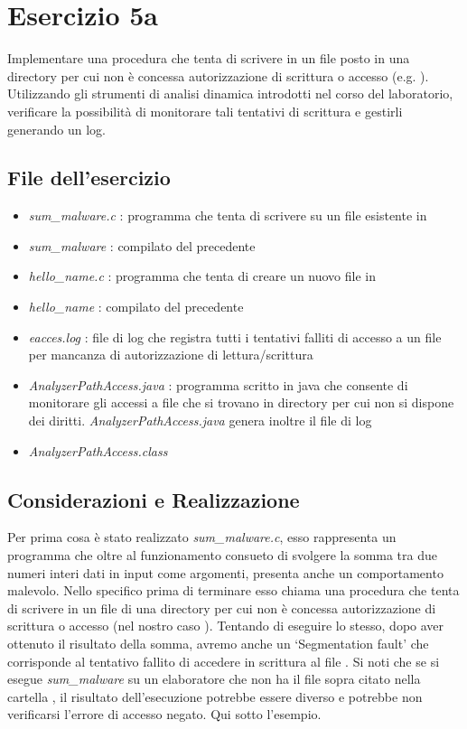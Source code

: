 \documentclass{article}
\newcommand{\filename}[1]{\textit{#1}}
\begin{document}
\section{Esercizio 5a}

\begin{consegna}
Implementare una procedura che tenta di scrivere in un file posto in una directory per cui non è concessa autorizzazione di scrittura o accesso (e.g. ).
Utilizzando gli strumenti di analisi dinamica introdotti nel corso del laboratorio, verificare la possibilità di monitorare tali tentativi di scrittura e gestirli generando un log.
\end{consegna}

\subsection{File dell'esercizio}
\begin{itemize}
    \item \filename{sum\_malware.c} : programma che tenta di scrivere su un file esistente in 
    \item \filename{sum\_malware} : compilato del precedente
    \item \filename{hello\_name.c} : programma che tenta di creare un nuovo file in 
    \item \filename{hello\_name} : compilato del precedente
    \item \filename{eacces.log} : file di log che registra tutti i tentativi falliti di accesso a un file per mancanza di autorizzazione di lettura/scrittura
    \item \filename{AnalyzerPathAccess.java} : programma scritto in java che consente di monitorare gli accessi a file che si trovano in directory per cui non si dispone dei diritti. \filename{AnalyzerPathAccess.java} genera inoltre il file di log
    \item \filename{AnalyzerPathAccess.class}
\end{itemize}

\subsection{Considerazioni e Realizzazione}
Per prima cosa è stato realizzato \filename{sum\_malware.c}, esso rappresenta un programma che oltre al funzionamento consueto di svolgere la somma tra due numeri interi dati in input come argomenti, presenta anche un comportamento malevolo. Nello specifico prima di terminare esso chiama una procedura che tenta di scrivere in un file di una directory per cui non è concessa autorizzazione di scrittura o accesso (nel nostro caso ). Tentando di eseguire lo stesso, dopo aver ottenuto il risultato della somma, avremo anche un `Segmentation fault' che corrisponde al tentativo fallito di accedere in scrittura al file . Si noti che se si esegue \filename{sum\_malware} su un elaboratore che non ha il file sopra citato nella cartella , il risultato dell'esecuzione potrebbe essere diverso e potrebbe non verificarsi l'errore di accesso negato. Qui sotto l'esempio.
\end{document}
